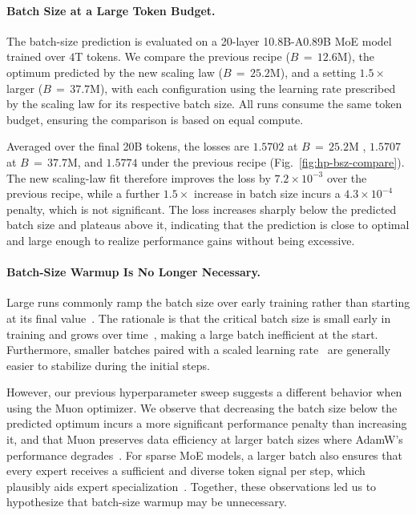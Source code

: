 \paragraph{Batch Size at a Large Token Budget.}
\label{sec:hpscaling-bsz}
The batch-size prediction is evaluated on a 20-layer 10.8B-A0.89B MoE model trained over $4$T tokens.
We compare the previous recipe ($B\,{=}\,12.6$M), the optimum predicted by the new scaling law ($B\,{=}\,25.2$M), and a setting $1.5\times$ larger ($B\,{=}\,37.7$M), with each configuration using the learning rate prescribed by the scaling law for its respective batch size.
All runs consume the same token budget, ensuring the comparison is based on equal compute.

Averaged over the final 20B tokens, the losses are $1.5702$ at $B\,{=}\,25.2$M , $1.5707$ at $B\,{=}\,37.7$M, and $1.5774$ under the previous recipe (Fig.~\ref{fig:hp-bsz-compare}).
The new scaling-law fit therefore improves the loss by $7.2\times10^{-3}$ over the previous recipe, while a further $1.5\times$ increase in batch size incurs a $4.3\times10^{-4}$ penalty, which is not significant.
The loss increases sharply below the predicted batch size and plateaus above it, indicating that the prediction is close to optimal and large enough to realize performance gains without being excessive.



\paragraph{Batch-Size Warmup Is No Longer Necessary.}
\label{sec:hpscaling-warmup}

Large runs commonly ramp the batch size over early training rather than starting at its final value~\citep{brown2020gpt3,liu2024deepseek}. 
The rationale is that the critical batch size is small early in training and grows over time~\citep{mccandlish2018largebatch,zhang2024criticalbatch}, making a large batch inefficient at the start. 
Furthermore, smaller batches paired with a scaled learning rate~\citep{goyal2017minibatch} are generally easier to stabilize during the initial steps.

However, our previous hyperparameter sweep suggests a different behavior when using the Muon optimizer. 
We observe that decreasing the batch size below the predicted optimum incurs a more significant performance penalty than increasing it, and that Muon preserves data efficiency at larger batch sizes where AdamW's performance degrades~\citep{jordan2024muon,essentialai2025muon}. 
For sparse MoE models, a larger batch also ensures that every expert receives a sufficient and diverse token signal per step, which plausibly aids expert specialization~\citep{global_balance}. 
Together, these observations led us to hypothesize that batch-size warmup may be unnecessary.


